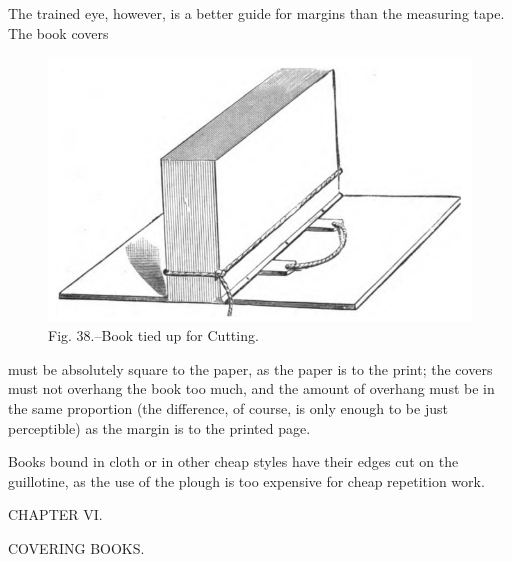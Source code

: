\documentclass[twoside]{book}
\begin{document}
The trained eye, however, is a better guide for
margins than the measuring tape. The book covers
	\begin{figure}[h]
		\centering
		\includegraphics[width=\textwidth]{Figures/_038.png}
		\caption*{Fig. 38.--Book tied up for Cutting.}
	\end{figure}
must be absolutely square to the paper, as the paper
is to the print; the covers must not overhang the
book too much, and the amount of overhang must
be in the same proportion (the difference, of course,
is only enough to be just perceptible) as the margin
is to the printed page.

Books bound in cloth or in other cheap styles
have their edges cut on the guillotine, as the use
of the plough is too expensive for cheap repetition
work.

\pagebreak


\thispagestyle{empty}

\vspace*{\fill}

\begin{center}

\begin{large}CHAPTER VI.\end{large}

\begin{small}COVERING BOOKS.\end{small}

\end{center}
\end{document}
